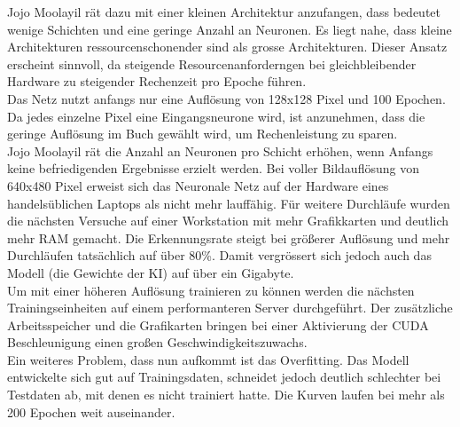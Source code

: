 \documentclass[conference]{IEEEtran}
\begin{document}
	Jojo Moolayil \cite{moolayil2019learn} rät dazu mit einer kleinen Architektur anzufangen,
	dass bedeutet wenige Schichten und eine geringe Anzahl an Neuronen. Es 
	liegt nahe, dass kleine Architekturen ressourcenschonender sind als 
	grosse Architekturen. Dieser Ansatz erscheint sinnvoll, da steigende 
	Resourcenanforderngen bei gleichbleibender Hardware zu steigender 
	Rechenzeit pro Epoche führen. \\
	
	Das Netz nutzt anfangs nur eine Auflösung von 128x128 Pixel und 100 
	Epochen. Da jedes einzelne Pixel eine Eingangsneurone wird, ist 
	anzunehmen, dass die geringe Auflösung im Buch 
	\cite{govers2018artificial} gewählt wird, um Rechenleistung zu 
	sparen. \\
	

	
	Jojo Moolayil \cite{moolayil2019learn} rät die Anzahl an Neuronen pro Schicht erhöhen, wenn Anfangs keine befriedigenden Ergebnisse erzielt werden.
	Bei voller Bildauflösung von 640x480 Pixel erweist sich das Neuronale 
	Netz auf der Hardware eines handelsüblichen Laptops als nicht mehr 
	lauffähig. Für weitere Durchläufe wurden die nächsten Versuche auf einer 
	Workstation mit mehr Grafikkarten und deutlich mehr RAM gemacht. 
	Die Erkennungsrate steigt bei größerer Auflösung und mehr Durchläufen 
	tatsächlich auf über 80\%. Damit vergrössert sich jedoch auch das Modell 
	(die Gewichte der KI) auf über ein Gigabyte.  \\
	
	Um mit einer höheren Auflösung trainieren zu können werden die 
	nächsten Trainingseinheiten auf einem performanteren Server 
	durchgeführt. Der zusätzliche Arbeitsspeicher und die Grafikarten 
	bringen bei einer Aktivierung der CUDA Beschleunigung einen großen 
	Geschwindigkeitszuwachs. \\
	
	Ein weiteres Problem, dass nun aufkommt ist das Overfitting. Das Modell entwickelte sich gut auf Trainingsdaten, schneidet jedoch deutlich schlechter bei Testdaten ab, mit denen es nicht trainiert hatte. Die Kurven laufen bei mehr als 200 Epochen weit auseinander.\\
	
\end{document}
